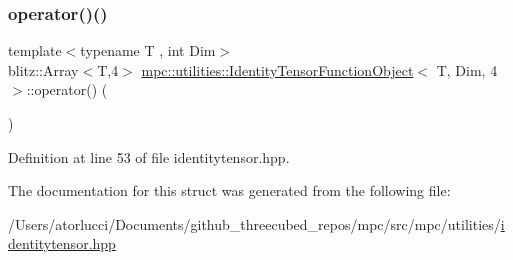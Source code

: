 \subsubsection{\texorpdfstring{operator()()}{operator()()}}
{\footnotesize\ttfamily template$<$typename T , int Dim$>$ \\
blitz\+::\+Array$<$T,4$>$ \mbox{\hyperlink{structmpc_1_1utilities_1_1_identity_tensor_function_object}{mpc\+::utilities\+::\+Identity\+Tensor\+Function\+Object}}$<$ T, Dim, 4 $>$\+::operator() (\begin{DoxyParamCaption}{ }\end{DoxyParamCaption})\hspace{0.3cm}{\ttfamily [inline]}}



Definition at line 53 of file identitytensor.\+hpp.



The documentation for this struct was generated from the following file\+:\begin{DoxyCompactItemize}
\item 
/\+Users/atorlucci/\+Documents/github\+\_\+threecubed\+\_\+repos/mpc/src/mpc/utilities/\mbox{\hyperlink{identitytensor_8hpp}{identitytensor.\+hpp}}\end{DoxyCompactItemize}
